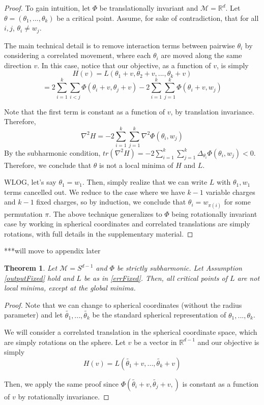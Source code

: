 \documentclass{article}
\newtheorem{theorem}{Theorem}[section]
\newcommand{\R}{{\mathbb{R}}}
\begin{document}
\begin{proof}
To gain intuition, let $\Phi$ be translationally invariant and $\mathcal{M} = \R^d$. Let $\theta = (\theta_1,...,\theta_k)$ be a critical point. Assume, for sake of contradiction, that for all $i, j$, $\theta_i \neq w_j$. 

The main technical detail is to remove interaction terms between pairwise $\theta_i$ by considering a correlated movement, where each $\theta_i$ are moved along the same direction $v$. In this case, notice that our objective, as a function of $v$, is simply
\[H(v) = L(\theta_1+ v, \theta_2 + v, ...,\theta_k + v)\]
\[ =  2\sum_{i=1}^k\sum_{i < j} \Phi(\theta_i+v,\theta_j+v) - 2\sum_{i=1}^k\sum_{j=1}^k \Phi(\theta_i+v,w_j)\]

Note that the first term is constant as a function of $v$, by translation invariance. Therefore,
\[\nabla^2 H = -2\sum_{i=1}^k \sum_{j=1}^k \nabla^2\Phi(\theta_i, w_j)\]
By the subharmonic condition, $tr(\nabla^2H) = -2\sum_{i=1}^k\sum_{j=1}^k \Delta_{\theta_i}\Phi(\theta_i,w_j) < 0$. Therefore, we conclude that $\theta$ is not a local minima of $H$ and $L$.

WLOG, let's say $\theta_1 = w_1$. Then, simply realize that we can write $L$ with $\theta_1,w_1$ terms cancelled out. We reduce to the case where we have $k-1$ variable charges and $k-1$ fixed charges, so by induction, we conclude that $\theta_i = w_{\pi(i)}$ for some permutation $\pi$. The above technique generalizes to $\Phi$ being rotationally invariant case by working in spherical coordinates and correlated translations are simply rotations, with full details in the supplementary material.
\end{proof}

***will move to appendix later

\begin{theorem}
Let $\mathcal{M} = S^{d-1}$ and $\Phi$ be strictly subharmonic. Let Assumption \ref{outputFixed} hold and $L$ be as in \eqref{errFixed}. Then, all critical points of $L$ are not local minima, except at the global minima. 
\end{theorem}

\begin{proof}
Note that we can change to spherical coordinates (without the radius parameter) and let $\widetilde{\theta_1},...,\widetilde{\theta_{k}}$ be the standard spherical representation of $\theta_1,...,\theta_k$. 

We will consider a correlated translation in the spherical coordinate space, which are simply rotations on the sphere. Let $v$ be a vector in $\R^{d-1}$ and our objective is simply
\[ H(v) = L( \widetilde{\theta_1}+v,...,\widetilde{\theta_{k}} +v)\]

Then, we apply the same proof since $\Phi( \widetilde{\theta_i}+v, \widetilde{\theta_j}+v,)$ is constant as a function of $v$ by rotationally invariance.
\end{proof}
\end{document}
